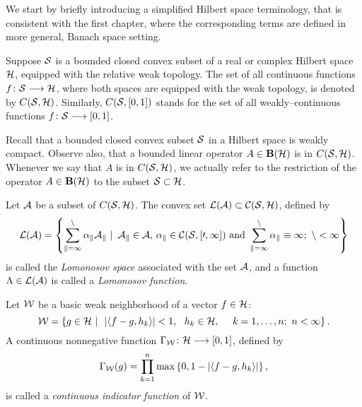 \medskip

We start by briefly introducing a simplified Hilbert space terminology, that
is consistent with the first chapter, where the corresponding terms are
defined in more general, Banach space setting.

\smallskip

\begin{defn}
Suppose ${\cal S}$ is a bounded closed convex subset of a real or complex Hilbert
space ${\cal H}$, equipped with the relative weak topology. The set of all
continuous functions $f\colon{\cal S}\longrightarrow{\cal H}$, where both spaces are equipped with
the weak topology, is denoted by $C({\cal S},{\cal H})$. Similarly, $C({\cal S},[0,1])$ stands
for the set of all weakly--continuous functions $f\colon{\cal S}\longrightarrow[0,1]$.
\end{defn}

\smallskip

\begin{rem}
Recall that a bounded closed convex subset ${\cal S}$ in a Hilbert space is weakly
compact. Observe also, that a bounded linear operator $A\in\mathbf B(\cal H)$ is in
$C({\cal S},{\cal H})$. Whenever we say that $A$ is in $C({\cal S},{\cal H})$, we actually refer to
the restriction of the operator $A\in\mathbf B(\cal H)$ to the subset ${\cal S}\subset{\cal H}$.
\end{rem}

\bigskip

\goodbreak

\begin{defn}
Let ${\cal A}$ be a subset of $C({\cal S},{\cal H})$. The convex set $\cal{L}({\cal A}) \subset
C({\cal S},{\cal H})$, defined by
\[ \cal{L}({\cal A}) = \left\{ \sum_{k=1}^n \alpha_k A_k\,\,|\,\,\, A_k\in{\cal A},\,
   \alpha_k\in C({\cal S},[0,1]) \text{ and } \sum_{k=1}^n\alpha_k \equiv 1;
    \,\, n < \infty\right\} \]
is called the {\em Lomonosov space} associated with the set ${\cal A}$, and a
function $\Lambda\in\cal{L}({\cal A})$ is called a {\em Lomonosov function}.
\end{defn}

\medskip

\begin{defn}
Let ${\cal W}$ be a basic weak neighborhood of a vector $f\in{\cal H}$:
\begin{equation}\label{e:WeakBase}
 \W=\set{g\in\h\,\,|\,\,\,\abs{\seq{f-g,h_k}} < 1, ~~ h_k\in\h, ~~~~
    k=1,\ldots,n; \,\, n < \infty}.
\end{equation}
A continuous nonnegative function $\Gamma_{\cal W}\colon{\cal H}\longrightarrow[0,1]$, defined by
\begin{equation}\label{e:CIF}
  \Gamma_\W(g)= \prod_{k=1}^n \max\set{0,1-\abs{\seq{f-g,h_k}}},
\end{equation}
is called a {\em continuous indicator function} of ${\cal W}$.
\end{defn}

